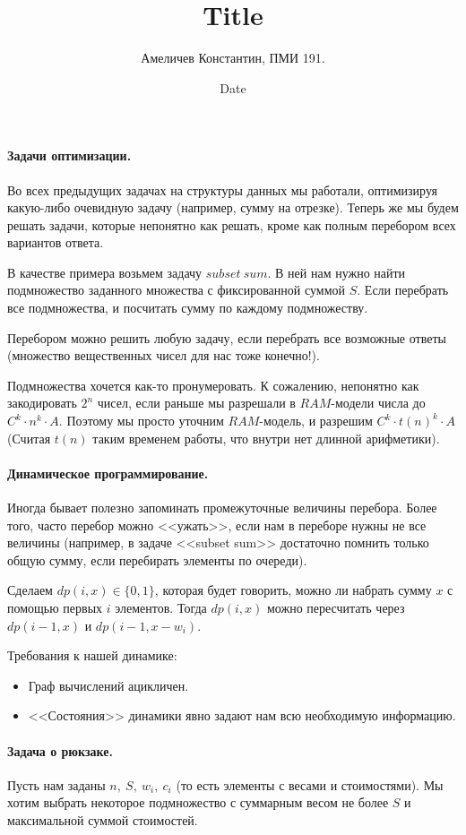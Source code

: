 \documentclass[12pt]{article}
\title{Title}
\author{Амеличев Константин, ПМИ 191.}
\date{Date}
\begin{document}
\paragraph{Задачи оптимизации.} Во всех предыдущих задачах на структуры данных мы работали, оптимизируя какую-либо очевидную задачу (например, сумму на отрезке). Теперь же мы будем решать задачи, которые непонятно как решать, кроме как полным перебором всех вариантов ответа.

В качестве примера возьмем задачу $subset\ sum$. В ней нам нужно найти подмножество заданного множества с фиксированной суммой $S$. Если перебрать все подмножества, и посчитать сумму по каждому подмножеству. 

Перебором можно решить любую задачу, если перебрать все возможные ответы (множество вещественных чисел для нас тоже конечно!).

Подмножества хочется как-то пронумеровать. К сожалению, непонятно как закодировать $2^n$ чисел, если раньше мы разрешали в $RAM$-модели числа до $C^k \cdot n^k \cdot A$. Поэтому мы просто уточним $RAM$-модель, и разрешим $C^k \cdot t(n)^k \cdot A$ (Считая $t(n)$ таким временем работы, что внутри нет длинной арифметики).

\paragraph{Динамическое программирование.} Иногда бывает полезно запоминать промежуточные величины перебора. Более того, часто перебор можно <<ужать>>, если нам в переборе нужны не все величины (например, в задаче <<subset sum>> достаточно помнить только общую сумму, если перебирать элементы по очереди).

Сделаем $dp(i, x) \in \{0, 1\}$, которая будет говорить, можно ли набрать сумму $x$ с помощью первых $i$ элементов. Тогда $dp(i, x)$ можно пересчитать через $dp(i - 1, x)$ и $dp(i - 1, x - w_i)$.

Требования к нашей динамике:
\begin{itemize}
    \item Граф вычислений ацикличен.
    \item <<Состояния>> динамики явно задают нам всю необходимую информацию.
\end{itemize}

\paragraph{Задача о рюкзаке.} Пусть нам заданы $n,\ S,\ w_i,\ c_i$ (то есть элементы с весами и стоимостями). Мы хотим выбрать некоторое подмножество с суммарным весом не более $S$ и максимальной суммой стоимостей.
\end{document}
